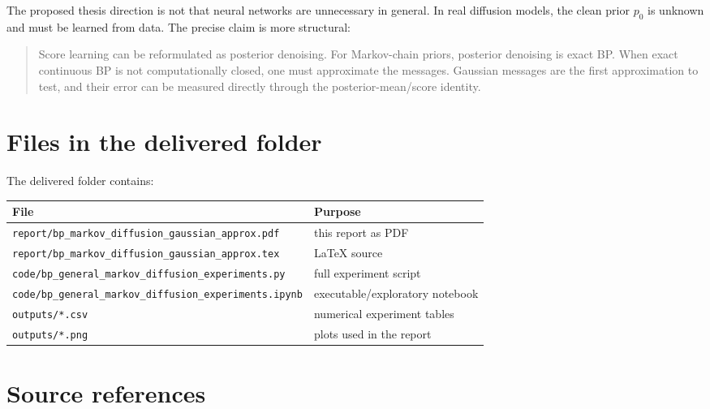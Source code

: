 \documentclass[11pt]{article}
\begin{document}
The proposed thesis direction is not that neural networks are unnecessary in general. In real diffusion models, the clean prior \(p_0\) is unknown and must be learned from data. The precise claim is more structural:
\begin{quote}
Score learning can be reformulated as posterior denoising. For Markov-chain priors, posterior denoising is exact BP. When exact continuous BP is not computationally closed, one must approximate the messages. Gaussian messages are the first approximation to test, and their error can be measured directly through the posterior-mean/score identity.
\end{quote}

\appendix
\section{Files in the delivered folder}

The delivered folder contains:
\begin{center}
\begin{tabular}{ll}
\toprule
File & Purpose \\
\midrule
\texttt{report/bp\_markov\_diffusion\_gaussian\_approx.pdf} & this report as PDF \\
\texttt{report/bp\_markov\_diffusion\_gaussian\_approx.tex} & LaTeX source \\
\texttt{code/bp\_general\_markov\_diffusion\_experiments.py} & full experiment script \\
\texttt{code/bp\_general\_markov\_diffusion\_experiments.ipynb} & executable/exploratory notebook \\
\texttt{outputs/*.csv} & numerical experiment tables \\
\texttt{outputs/*.png} & plots used in the report \\
\bottomrule
\end{tabular}
\end{center}

\section{Source references}
\end{document}
